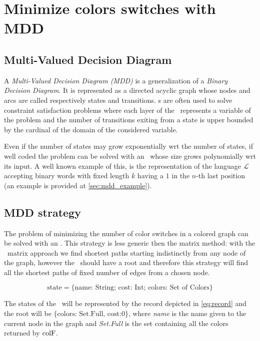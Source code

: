 \section{Minimize colors switches with MDD}

\subsection{Multi-Valued Decision Diagram}

A \textit{Multi-Valued Decision Diagram (MDD)}\cite{regin} is a generalization of a \textit{Binary Decision Diagram}. It is represented as a directed acyclic graph whose nodes and arcs are called respectively states and transitions. \mdd s are often used to solve constraint satisfaction problems where each layer of the \mdd\ represents a variable of the problem and the number of transitions exiting from a state is upper bounded by the cardinal of the domain of the considered variable.

Even if the number of states may grow exponentially wrt the number of states, if well coded the problem can be solved with an \mdd\ whose size grows polynomially wrt its input. A well known example of this, is the representation of the language $\mathcal{L}$ accepting binary words with fixed length $k$ having a $1$ in the $n$-th last position (an example is provided at \cref{sec:mdd_example}).

\subsection{MDD strategy}
\label{sec:algo_mdd}
The problem of minimizing the number of color switches in a colored graph can be solved with an \mdd. This strategy is less generic then the matrix method: with the \FW\ matrix approach we find shortest paths starting indistinctly from any node of the graph, however the \mdd\ should have a root and therefore this strategy will find all the shortest paths of fixed number of edges from a chosen node.

\begin{equation}
  \label{eq:record}
  \text{state} = \{\text{name: String; cost: Int; colors: Set of Colors}\}
\end{equation}

The states of the \mdd\ will be represented by the record depicted in \cref{eq:record} and the root will be $\{\text{colors: Set.Full, cost:} 0\}$, where \textit{name} is the name given to the current node in the graph and \textit{Set.Full} is the set containing all the colors returned by $\text{colF}$.


